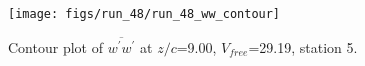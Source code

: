 \begin{figure}[H]
\centering
\texttt{[image: figs/run\_48/run\_48\_ww\_contour]}
\caption{Contour plot of $\overline{w^\prime w^\prime}$ at $z/c$=9.00, $V_{free}$=29.19, station 5.}
\label{fig:run_48_ww_contour}
\end{figure}


